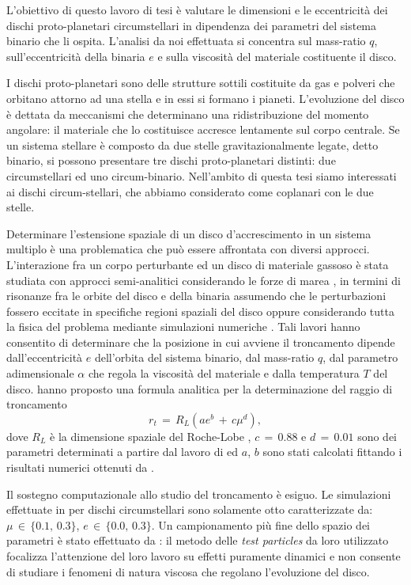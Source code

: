 \documentclass[12pt, a4paper]{report}
\begin{document}
L'obiettivo di questo lavoro di tesi è valutare le dimensioni e le eccentricità dei dischi proto-planetari circumstellari in dipendenza dei parametri del sistema binario che li ospita.
L'analisi da noi effettuata si concentra sul mass-ratio $q$, sull'eccentricità della binaria $e$ e sulla viscosità del materiale costituente il disco.

I dischi proto-planetari sono delle strutture sottili costituite da gas e polveri che orbitano attorno ad una stella e in essi si formano i pianeti.
L'evoluzione del disco è dettata da meccanismi che determinano una ridistribuzione del momento angolare: il materiale che lo costituisce accresce lentamente sul corpo centrale.
Se un sistema stellare è composto da due stelle gravitazionalmente legate, detto binario, si possono presentare tre dischi proto-planetari distinti: due circumstellari ed uno circum-binario.
Nell'ambito di questa tesi siamo interessati ai dischi circum-stellari, che abbiamo considerato come coplanari con le due stelle.

Determinare l'estensione spaziale di un disco d'accrescimento in un sistema multiplo è una problematica che può essere affrontata con diversi approcci.
L'interazione fra un corpo perturbante ed un disco di materiale gassoso è stata studiata con approcci semi-analitici considerando le forze di marea \parencite{PapaloizouPringle1977}, in termini di risonanze fra le orbite del disco e della binaria assumendo che le perturbazioni fossero eccitate in specifiche regioni spaziali del disco \parencite{GoldreichTremaine1980} oppure considerando tutta la fisica del problema mediante simulazioni numeriche \parencite{ArtymowiczLubow1994}.
Tali lavori hanno consentito di determinare che la posizione in cui avviene il troncamento dipende dall'eccentricità $e$ dell'orbita del sistema binario, dal mass-ratio $q$, dal parametro adimensionale $\alpha$ che regola la viscosità del materiale e dalla temperatura $T$ del disco. 
\cite{ManaraTronc2019} hanno proposto una formula analitica per la determinazione del raggio di troncamento
\begin{equation}
r_t\,=\,R_{L} (a e^b\,+\,c\mu^d),
\label{eq:tronc_disc}
\end{equation}
dove $R_L$ è la dimensione spaziale del Roche-Lobe \parencite{Eggleton1983}, $c\,=\,0.88$ e $d\,=\,0.01$ sono dei parametri determinati a partire dal lavoro di \cite{PapaloizouPringle1977} ed $a$, $b$ sono stati calcolati fittando i risultati numerici ottenuti da \cite{ArtymowiczLubow1994}.

Il sostegno computazionale allo studio del troncamento è esiguo. 
Le simulazioni effettuate in \cite{ArtymowiczLubow1994} per dischi circumstellari sono solamente otto caratterizzate da: $\mu\,\in\,\{0.1,\,0.3\}$, $e\,\in\,\{0.0,\,0.3\}$.
Un campionamento più fine dello spazio dei parametri è stato effettuato da \cite{Pichardo2005}: il metodo delle \textit{test particles} da loro utilizzato focalizza l'attenzione del loro lavoro su effetti puramente dinamici e non consente di studiare i fenomeni di natura viscosa che regolano l'evoluzione del disco.
\end{document}
